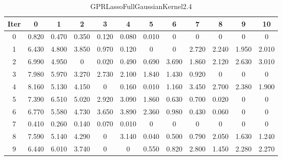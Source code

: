 \begin{table}
	\begin{center}
		\begin{tabular}{|c|c|c|c|c|c|c|c|c|c|c|c|}
			\hline
			Iter & 0 & 1 & 2 & 3 & 4 & 5 & 6 & 7 & 8 & 9 & 10 \\
			\hline
			0 & 0.820 & 0.470 & 0.350 & 0.120 & 0.080 & 0.010 & 0 & 0 & 0 & 0 & 0 \\
			\hline
			1 & 6.430 & 4.800 & 3.850 & 0.970 & 0.120 & 0 & 0 & 2.720 & 2.240 & 1.950 & 2.010 \\
			\hline
			2 & 6.990 & 4.950 & 0 & 0.020 & 0.490 & 0.690 & 3.690 & 1.860 & 2.120 & 2.630 & 3.010 \\
			\hline
			3 & 7.980 & 5.970 & 3.270 & 2.730 & 2.100 & 1.840 & 1.430 & 0.920 & 0 & 0 & 0 \\
			\hline
			4 & 8.160 & 5.130 & 4.150 & 0 & 0.160 & 0.010 & 1.160 & 3.450 & 2.700 & 2.380 & 1.900 \\
			\hline
			5 & 7.390 & 6.510 & 5.020 & 2.920 & 3.090 & 1.860 & 0.630 & 0.700 & 0.020 & 0 & 0 \\
			\hline
			6 & 6.770 & 5.580 & 4.730 & 3.650 & 3.890 & 2.360 & 0.980 & 0.430 & 0.060 & 0 & 0 \\
			\hline
			7 & 0.410 & 0.260 & 0.140 & 0.070 & 0.010 & 0 & 0 & 0 & 0 & 0 & 0 \\
			\hline
			8 & 7.590 & 5.140 & 4.290 & 0 & 3.140 & 0.040 & 0.500 & 0.790 & 2.050 & 1.630 & 1.240 \\
			\hline
			9 & 6.440 & 6.010 & 3.740 & 0 & 0 & 0.550 & 0.820 & 2.800 & 1.450 & 2.280 & 2.270 \\
			\hline
		\end{tabular}
	\end{center}
	\caption{GPRLassoFullGaussianKernel2.4}
\end{table}
